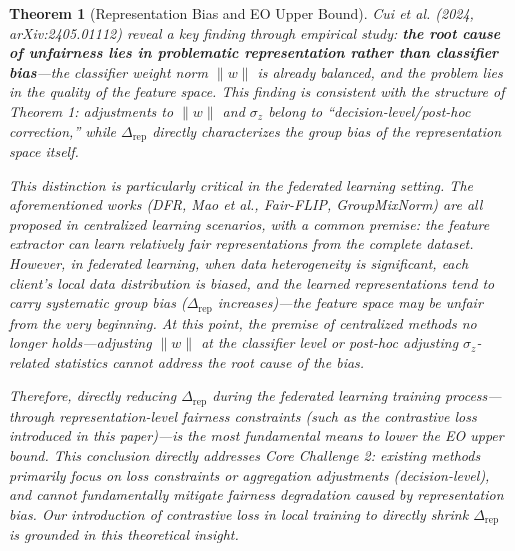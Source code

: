 \documentclass[11pt]{article}
\newtheorem{theorem}{Theorem}
\begin{document}
\begin{theorem}[Representation Bias and EO Upper Bound]
Cui et al. (2024, arXiv:2405.01112) reveal a key finding through empirical study: \textbf{the root cause of unfairness lies in problematic representation rather than classifier bias}---the classifier weight norm $\|w\|$ is already balanced, and the problem lies in the quality of the feature space. This finding is consistent with the structure of Theorem 1: adjustments to $\|w\|$ and $\sigma_z$ belong to ``decision-level/post-hoc correction,'' while $\Delta_{\mathrm{rep}}$ directly characterizes the group bias of the representation space itself.

This distinction is particularly critical in the federated learning setting. The aforementioned works (DFR, Mao et al., Fair-FLIP, GroupMixNorm) are all proposed in centralized learning scenarios, with a common premise: the feature extractor can learn relatively fair representations from the complete dataset. However, in federated learning, when data heterogeneity is significant, each client's local data distribution is biased, and the learned representations tend to carry systematic group bias ($\Delta_{\mathrm{rep}}$ increases)---the feature space may be unfair from the very beginning. At this point, the premise of centralized methods no longer holds---adjusting $\|w\|$ at the classifier level or post-hoc adjusting $\sigma_z$-related statistics cannot address the root cause of the bias.

Therefore, directly reducing $\Delta_{\mathrm{rep}}$ during the federated learning training process---through representation-level fairness constraints (such as the contrastive loss introduced in this paper)---is the most fundamental means to lower the EO upper bound. This conclusion directly addresses Core Challenge 2: existing methods primarily focus on loss constraints or aggregation adjustments (decision-level), and cannot fundamentally mitigate fairness degradation caused by representation bias. Our introduction of contrastive loss in local training to directly shrink $\Delta_{\mathrm{rep}}$ is grounded in this theoretical insight.
\end{theorem}
\end{document}
